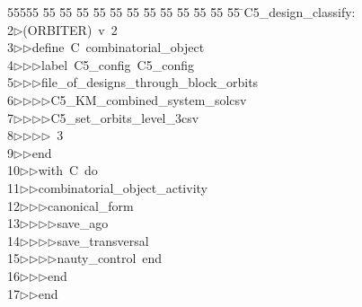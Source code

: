 %
%
\begin{tabbing}
55555 \= 55 \= 55 \= 55 \= 55 \= 55 \= 55 \= 55 \= 55 \= 55 \= 55 \= 55 \= 55 \= \>C5\_design\_classify:\\[0pt]
2\>$\triangleright$\>(ORBITER)\ v\ 2\ \\[0pt]
3\>$\triangleright$\>$\triangleright$\>define\ C\ combinatorial\_object\ \\[0pt]
4\>$\triangleright$\>$\triangleright$\>$\triangleright$\>label\ C5\_config\ C5\_config\ \\[0pt]
5\>$\triangleright$\>$\triangleright$\>$\triangleright$\>file\_of\_designs\_through\_block\_orbits\ \\[0pt]
6\>$\triangleright$\>$\triangleright$\>$\triangleright$\>$\triangleright$\>C5\_KM\_combined\_system\_solcsv\ \\[0pt]
7\>$\triangleright$\>$\triangleright$\>$\triangleright$\>$\triangleright$\>C5\_set\_orbits\_level\_3csv\ \\[0pt]
8\>$\triangleright$\>$\triangleright$\>$\triangleright$\>$\triangleright$\ 3\ \\[0pt]
9\>$\triangleright$\>$\triangleright$\>end\ \\[0pt]
10\>$\triangleright$\>$\triangleright$\>with\ C\ do\ \\[0pt]
11\>$\triangleright$\>$\triangleright$\>combinatorial\_object\_activity\ \\[0pt]
12\>$\triangleright$\>$\triangleright$\>$\triangleright$\>canonical\_form\ \\[0pt]
13\>$\triangleright$\>$\triangleright$\>$\triangleright$\>$\triangleright$\>save\_ago\ \\[0pt]
14\>$\triangleright$\>$\triangleright$\>$\triangleright$\>$\triangleright$\>save\_transversal\ \\[0pt]
15\>$\triangleright$\>$\triangleright$\>$\triangleright$\>$\triangleright$\>nauty\_control\ end\ \\[0pt]
16\>$\triangleright$\>$\triangleright$\>$\triangleright$\>end\ \\[0pt]
17\>$\triangleright$\>$\triangleright$\>end\ \\[0pt]

\end{tabbing}
